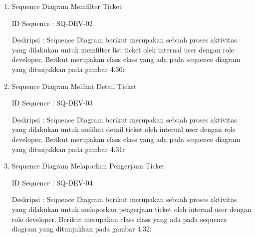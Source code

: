 \documentclass[12pt]{article}
\begin{document}
\begin{enumerate}[label=\textbf{4.\arabic*.}]
\begin{enumerate}[label=\textbf{4.1.\arabic*.}, wide, labelwidth=!, labelindent=0pt]
\begin{enumerate}[label=\textbf{4.1.7.\arabic*.}, wide, labelwidth=!, labelindent=0pt]
\begin{enumerate}[label=\arabic*.]
                \item Sequence Diagram Memfilter Ticket
                
                \noindent ID Sequence	: SQ-DEV-02
                
                \noindent Deskripsi	: Sequence Diagram berikut merupakan sebuah proses aktivitas yang dilakukan untuk memfilter list ticket oleh internal user dengan role developer. Berikut merupakan class class yang ada pada sequence diagram yang ditunjukkan pada gambar 4.30:
                
                
                \item Sequence Diagram Melihat Detail Ticket
                
                \noindent ID Sequence	: SQ-DEV-03
                
                \noindent Deskripsi	: Sequence Diagram berikut merupakan sebuah proses aktivitas yang dilakukan untuk melihat detail ticket oleh internal user dengan role developer. Berikut merupakan class class yang ada pada sequence diagram yang ditunjukkan pada gambar 4.31:
                
                
                \item Sequence Diagram Melaporkan Pengerjaan Ticket
                
                \noindent ID Sequence	: SQ-DEV-04
                
                \noindent Deskripsi	: Sequence Diagram berikut merupakan sebuah proses aktivitas yang dilakukan untuk melaporkan pengerjaan ticket oleh internal user dengan role developer. Berikut merupakan class class yang ada pada sequence diagram yang ditunjukkan pada gambar 4.32:
                

\end{enumerate}
\end{enumerate}
\end{enumerate}
\end{enumerate}
\end{document}
